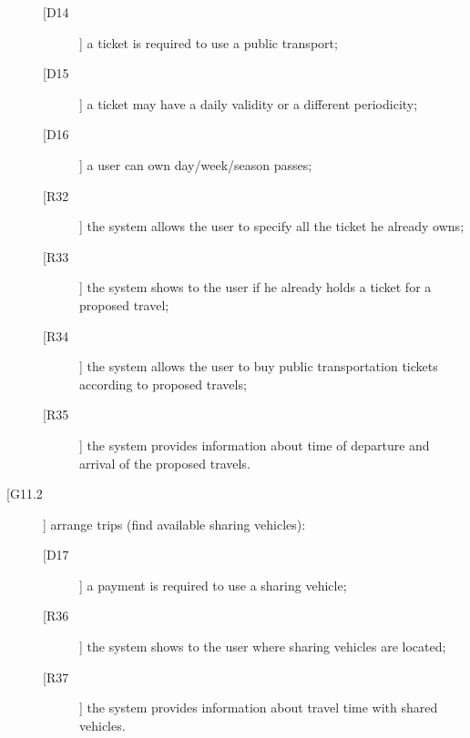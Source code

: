\begin{description}
\begin{description}
	\item[[D14]] a ticket is required to use a public transport;
	\item[[D15]] a ticket may have a daily validity or a different periodicity;
	\item[[D16]] a user can own day/week/season passes;
	\newline
	\item[[R32]] the system allows the user to specify all the ticket he already owns;
	\item[[R33]] the system shows to the user if he already holds a ticket for a proposed travel;
	\item[[R34]] the system allows the user to buy public transportation tickets according to proposed travels;
	\item[[R35]] the system provides information about time of departure and arrival of the proposed travels.
	\end{description}
\item[[G11.2]] arrange trips (find available sharing vehicles):
	\begin{description}
	\item[[D17]] a payment is required to use a sharing vehicle;
	\newline
	\item[[R36]] the system shows to the user where sharing vehicles are located;
	\item[[R37]] the system provides information about travel time with shared vehicles.
	\end{description}
\end{description}
